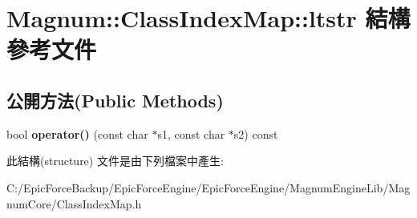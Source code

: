 \hypertarget{struct_magnum_1_1_class_index_map_1_1ltstr}{}\section{Magnum\+:\+:Class\+Index\+Map\+:\+:ltstr 結構 參考文件}
\label{struct_magnum_1_1_class_index_map_1_1ltstr}
\subsection*{公開方法(Public Methods)}
\begin{DoxyCompactItemize}
\item 
bool {\bfseries operator()} (const char $\ast$s1, const char $\ast$s2) const \hypertarget{struct_magnum_1_1_class_index_map_1_1ltstr_a729924a2e503e5a39a4b1c9ac82651aa}{}\label{struct_magnum_1_1_class_index_map_1_1ltstr_a729924a2e503e5a39a4b1c9ac82651aa}

\end{DoxyCompactItemize}


此結構(structure) 文件是由下列檔案中產生\+:\begin{DoxyCompactItemize}
\item 
C\+:/\+Epic\+Force\+Backup/\+Epic\+Force\+Engine/\+Epic\+Force\+Engine/\+Magnum\+Engine\+Lib/\+Magnum\+Core/Class\+Index\+Map.\+h\end{DoxyCompactItemize}
